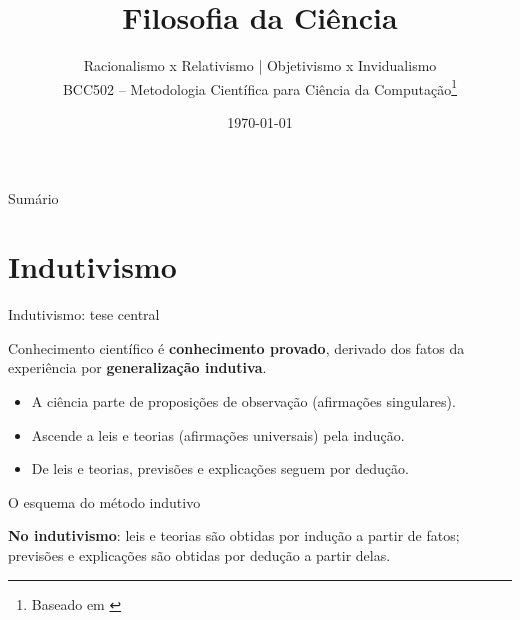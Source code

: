 \documentclass[aspectratio=169]{beamer}
\title{Filosofia da Ci\^encia}
\author{Racionalismo x Relativismo | Objetivismo x Invidualismo \\
BCC502 -- Metodologia Cient\'ifica para Ci\^encia da Computa\c c\~ao\footnote{Baseado em \citep{chalmers1993ciencia}}}
\date{\today}
\newcommand{\impt}[1]{\textcolor{maccent}{\textbf{#1}}}
\newcommand{\ntc}[1]{\textcolor{mprimary}{#1}}
\begin{document}
\begin{frame}[plain]\titlepage\end{frame}

\begin{frame}{Sum\'ario}\tableofcontents\end{frame}

\section{Indutivismo}

\begin{frame}{Indutivismo: tese central}
\begin{block}{}
Conhecimento cient\'ifico \'e \impt{conhecimento provado}, derivado dos fatos da experi\^encia por \impt{generaliza\c c\~ao indutiva}.
\end{block}
\vspace{0.2cm}
\begin{itemize}
    \item A ci\^encia parte de \ntc{proposi\c c\~oes de observa\c c\~ao} (afirma\c c\~oes singulares).
    \item Ascende a \ntc{leis e teorias} (afirma\c c\~oes universais) pela indu\c c\~ao.
    \item De leis e teorias, previs\~oes e explica\c c\~oes seguem por \ntc{dedu\c c\~ao}.
\end{itemize}
\end{frame}

\begin{frame}{O esquema do m\'etodo indutivo}
\begin{center}
\vspace{0.3cm}
\end{center}
\vspace{0.3cm}
\impt{No indutivismo}: leis e teorias s\~ao obtidas por indu\c c\~ao a partir de fatos; previs\~oes e explica\c c\~oes s\~ao obtidas por dedu\c c\~ao a partir delas.
\end{frame}
\end{document}
